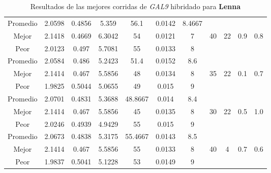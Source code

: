 \begin{table}[h!]
\begin{center}
\begin{tabular}{|c|c|c|c|c|c|c|c|c|c|c|}
        \hline
        \hline
            Promedio  & 2.0598 & 0.4856 & 5.359 & 56.1 & 0.0142 & 8.4667 &  &  &  & \\
            \cline{1-7}
            Mejor & 2.1418 & 0.4669  & 6.3042 & 54 & 0.0121 & 7 & 40 & 22 & 0.9 & 0.8\\
            \cline{1-7}
            Peor & 2.0123 & 0.497  & 5.7081 & 55 & 0.0133 & 8 &  &  &  & \\
        \hline
        \hline
            Promedio  & 2.0584 & 0.486 & 5.2423 & 51.4 & 0.0152 & 8.6 &  &  &  & \\
            \cline{1-7}
            Mejor & 2.1414 & 0.467  & 5.5856 & 48 & 0.0134 & 8 & 35 & 22 & 0.1 & 0.7\\
            \cline{1-7}
            Peor & 1.9825 & 0.5044  & 5.0655 & 49 & 0.015 & 9 &  &  &  & \\
        \hline
        \hline
            Promedio  & 2.0701 & 0.4831 & 5.3688 & 48.8667 & 0.014 & 8.4 &  &  &  & \\
            \cline{1-7}
            Mejor & 2.1414 & 0.467  & 5.5856 & 45 & 0.0135 & 8 & 30 & 22 & 0.5 & 1.0\\
            \cline{1-7}
            Peor & 2.0246 & 0.4939  & 4.9429 & 55 & 0.015 & 9 &  &  &  & \\
        \hline
        \hline
            Promedio  & 2.0673 & 0.4838 & 5.3175 & 55.4667 & 0.0143 & 8.5 &  &  &  & \\
            \cline{1-7}
            Mejor & 2.1414 & 0.467  & 5.5856 & 55 & 0.0133 & 8 & 40 & 4 & 0.7 & 0.6\\
            \cline{1-7}
            Peor & 1.9837 & 0.5041  & 5.1228 & 53 & 0.0149 & 9 &  &  &  & \\
        \hline
        \end{tabular}
        \caption{Resultados de las mejores corridas de \emph{GAL9} hibridado para {\bf Lenna}}
        \label{tb:tableGAL9}
    \end{center}
\end{table}
